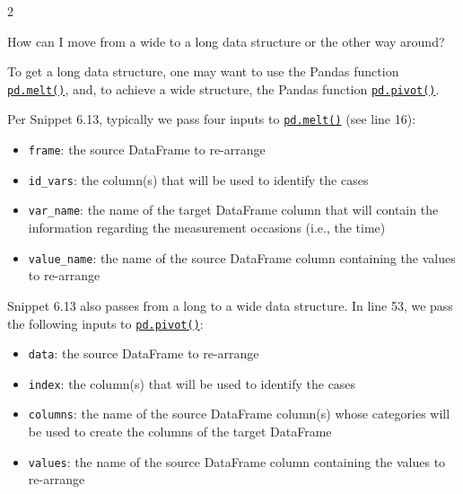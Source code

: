 \documentclass[a4paper,11pt]{book}
\newcommand{\question}[1]{%
    \begin{tcolorbox}[colback=comp_c!10,colframe=comp_c,sidebyside align=top,width=\linewidth,before skip=1ex]
        #1
    \end{tcolorbox}
    \switchcolumn%
}
\newcommand{\note}[1]{%
    \begin{tcolorbox}[colback=white!0,colframe=white!10,width=\linewidth,before skip=1ex]
        #1
    \end{tcolorbox}
}
\begin{document}
\begin{paracol}{2}
	\question{\raggedright How can I move from a wide to a long data structure or the other way around?}
	\note{To get a long data structure, one may want to use the Pandas function \href{https://pandas.pydata.org/docs/reference/api/pandas.melt.html?highlight=melt\#pandas.melt}{\texttt{pd.melt()}}, and, to achieve a wide structure, the Pandas function \href{https://pandas.pydata.org/docs/reference/api/pandas.pivot.html?highlight=pivot\#pandas.pivot}{\texttt{pd.pivot()}}.

	\quad Per Snippet 6.13, typically we pass four inputs to \href{https://pandas.pydata.org/docs/reference/api/pandas.melt.html?highlight=melt\#pandas.melt}{\texttt{pd.melt()}} (see line 16):
	
	\begin{itemize}
		\item  \texttt{frame}: the source DataFrame to re-arrange 
		\item  \texttt{id\_vars}: the column(s) that will be used to identify the cases
		\item  \texttt{var\_name}: the name of the target DataFrame column that will contain the information regarding the measurement occasions (i.e., the time)
		\item  \texttt{value\_name}: the name of the source DataFrame column containing the values to re-arrange
	\end{itemize}

	\quad Snippet 6.13 also passes from a long to a wide data structure. In line 53, we pass the following inputs to \href{https://pandas.pydata.org/docs/reference/api/pandas.pivot.html?highlight=pivot\#pandas.pivot}{\texttt{pd.pivot()}}:
	
	\begin{itemize}
		\item \texttt{data}: the source DataFrame to re-arrange
		\item \texttt{index}: the column(s) that will be used to identify the cases
		\item \texttt{columns}: the name of the source DataFrame column(s) whose categories will be used to create the columns of the target DataFrame
		\item \texttt{values}: the name of the source DataFrame column containing the values to re-arrange
	\end{itemize}
	}
\end{paracol}
\end{document}
